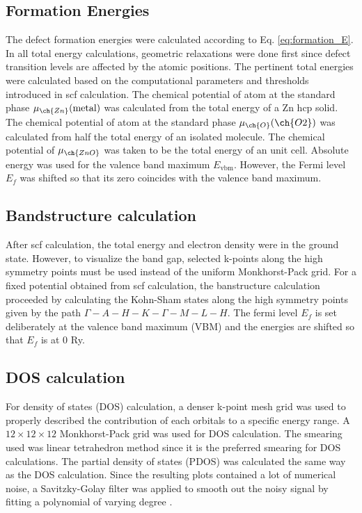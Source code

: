 \subsection{Formation Energies}
The defect formation energies were calculated according to Eq. \eqref{eq:formation_E}. In all total energy calculations, geometric relaxations were done first since defect transition levels are affected by the atomic positions. The pertinent total energies were calculated based on the computational parameters and thresholds introduced in scf calculation. The chemical potential of  atom at the standard phase $\mu_{\ch{Zn}}(\text{metal})$ was calculated from the total energy of a Zn hcp solid. The chemical potential of  atom at the standard phase
$\mu_{\ch{O}}(\ch{O2})$ was calculated from  half the total energy of an isolated  molecule. The chemical potential of $\mu_{\ch{ZnO}}$ was taken to be the total energy of an unit cell. Absolute energy was used for the valence band maximum $E_{\text{vbm}}$. However, the Fermi level $E_f$ was shifted so that its zero coincides with the valence band maximum.

\subsection{Bandstructure calculation}
After scf calculation, the total energy and electron density were in the ground state. However, to visualize the band gap, selected k-points along the high symmetry points must be used instead of the uniform Monkhorst-Pack grid. For a fixed potential obtained from scf calculation, the banstructure calculation proceeded by calculating the Kohn-Sham states along the high symmetry points given by the path $\Gamma-A-H-K-\Gamma-M-L-H$. The fermi level $E_f$ is set deliberately at the valence band maximum (VBM) and the energies are shifted so that $E_f$ is at  0 Ry.

\subsection{DOS calculation}
For density of states (DOS) calculation, a denser k-point mesh grid was used to properly described the contribution of each orbitals to a  specific energy range. A $12 \times 12 \times 12$ Monkhorst-Pack grid was used for DOS calculation. The smearing used was linear tetrahedron method since it is the preferred smearing for DOS calculations. The partial density of states (PDOS) was calculated the same way as the  DOS calculation. Since the resulting plots contained a lot of numerical noise, a Savitzky-Golay filter was applied to smooth out the noisy signal by fitting a polynomial of varying degree \citep{Savitzky1964,Luo2005}.

